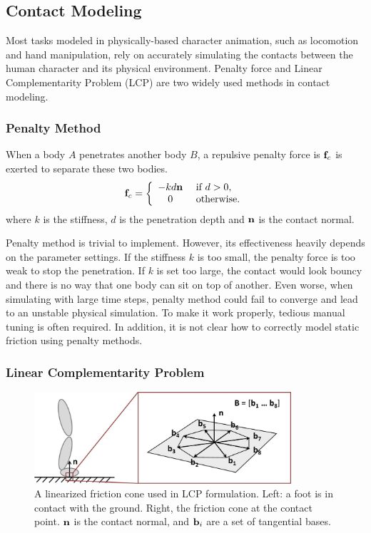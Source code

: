 \subsection{Contact Modeling}

Most tasks modeled in physically-based character animation, such as locomotion and hand manipulation, rely on accurately simulating the contacts between the human character and its physical environment. Penalty force and Linear Complementarity Problem (LCP) are two widely used methods in contact modeling.

\subsubsection{Penalty Method}
When a body $A$ penetrates another body $B$, a repulsive penalty force is $\mathbf{f}_c$ is exerted to separate these two bodies.
\begin{equation}
\mathbf{f}_c=
\left\{
\begin{array}{cl}
-kd\mathbf{n} & \textrm{        if } d > 0,\\
0 & \textrm{        otherwise.}
\end{array}
\right.
\end{equation}
where $k$ is the stiffness, $d$ is the penetration depth and $\mathbf{n}$ is the contact normal. 

Penalty method is trivial to implement. However, its effectiveness heavily depends on the parameter settings. If the stiffness $k$ is too small, the penalty force is too weak to stop the penetration. If $k$ is set too large, the contact would look bouncy and there is no way that one body can sit on top of another. Even worse, when simulating with large time steps, penalty method could fail to converge and lead to an unstable physical simulation. To make it work properly, tedious manual tuning is often required. In addition, it is not clear how to correctly model static friction using penalty methods.

\subsubsection{Linear Complementarity Problem}


\begin{figure}[h]
  \centering
  \includegraphics[width=0.85\textwidth]{figures/contact.jpg}
  \caption{A linearized friction cone used in LCP formulation. Left: a foot is in contact with the ground. Right, the friction cone at the contact point. $\mathbf{n}$ is the contact normal, and $\mathbf{b}_i$ are a set of tangential bases.}
  \label{fig:contactCone}
\end{figure}

